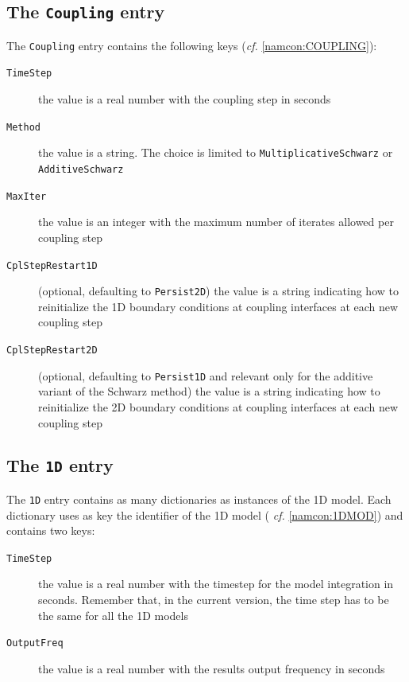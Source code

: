 \documentclass[Coupling]{../../data/TelemacDoc} %
\begin{document}
\subsection{The \texttt{Coupling} entry}
The \texttt{Coupling} entry contains the following keys ({\em cf.} \ref{namcon:COUPLING}):
\begin{description}
  \item[\texttt{TimeStep}] the value is a real number with the
    coupling step in seconds    
  \item[\texttt{Method}] the value is a string. The choice is limited to
    \texttt{MultiplicativeSchwarz} or\\
    \texttt{AdditiveSchwarz}
  \item[\texttt{MaxIter}] the value is an integer with the maximum
    number of iterates allowed per coupling step
  \item[\texttt{CplStepRestart1D}] (optional, defaulting to
    \texttt{Persist2D}) the value is a string indicating how to
    reinitialize the 1D boundary conditions at coupling interfaces at
    each new coupling step
  \item[\texttt{CplStepRestart2D}] (optional, defaulting to
    \texttt{Persist1D} and relevant only for the additive variant of
    the Schwarz method) the value is a string indicating how to
    reinitialize the 2D boundary conditions at coupling interfaces at
    each new coupling step
\end{description}

\subsection{The \texttt{1D} entry}
The \texttt{1D} entry contains as many dictionaries as instances of the 1D
model. Each dictionary uses as key the identifier of the 1D model ({\em
  cf.} \ref{namcon:1DMOD}) and contains two keys:
\begin{description}
  \item[\texttt{TimeStep}] the value is a real number with the
    timestep for the model integration in seconds. Remember that, in the 
    current version, the time step has to be the same for all the 1D 
    models   
  \item[\texttt{OutputFreq}] the value is a real number with the
    results output frequency in seconds
\end{description}
 
\end{document}
